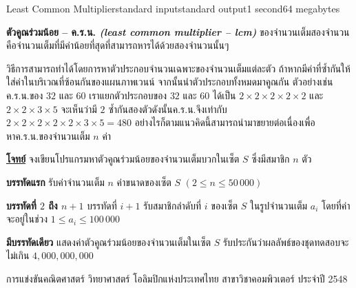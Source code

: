 \documentclass[11pt,a4paper]{article}
\begin{document}
\begin{problem}{Least Common Multiplier}{standard input}{standard output}{1 second}{64 megabytes}

\textbf{ตัวคูณร่วมน้อย – ค.ร.น. \textit{(least common multiplier – lcm)}} ของจำนวนเต็มสองจำนวนคือจำนวนเต็มที่มีค่าน้อยที่สุดที่สามารถหารได้ด้วยสองจำนวนนั้นๆ

วิธีการสามารถทำได้โดยการหาตัวประกอบจำนวนเฉพาะของจำนวนเต็มแต่ละตัว ถ้าหากมีค่าที่ซ้ำกันให้ใส่ค่าในบริเวณที่ซ้อนกันของแผนภาพเวนน์ จากนั้นนำตัวประกอบทั้งหมดมาคูณกัน ตัวอย่างเช่นค.ร.น.ของ $32$ และ $60$ เราแยกตัวประกอบของ $32$ และ $60$ ได้เป็น $2\times 2\times 2\times 2\times 2$ และ $2\times 2\times 3\times 5$ จะเห็นว่ามี $2$ ซ้ำกันสองตัวดังนั้นค.ร.น.จึงเท่ากับ $2\times 2\times 2\times 2\times 2\times 3\times 5 = 480$ อย่างไรก็ตามแนวคิดนี้สามารถนำมาขยายต่อเนื่องเพื่อหาค.ร.น.ของจำนวนเต็ม $n$ ค่า

\bigskip
\underline{\textbf{โจทย์}}  จงเขียนโปรแกรมหาตัวคูณร่วมน้อยของจำนวนเต็มบวกในเซ็ต $S$ ซึ่งมีสมาชิก $n$ ตัว

\InputFile

\textbf{บรรทัดแรก} รับค่าจำนวนเต็ม $n$ ค่าขนาดของเซ็ต $S$  $(2 \leq n \leq 50\,000)$

\textbf{บรรทัดที่ $2$ ถึง $n+1$} บรรทัดที่ $i+1$ รับสมาชิกลำดับที่ $i$ ของเซ็ต $S$ ในรูปจำนวนเต็ม $a_i$ โดยที่ค่าจะอยู่ในช่วง $1 \leq a_i \leq 100\,000$

\OutputFile

\textbf{มีบรรทัดเดียว} แสดงค่าตัวคูณร่วมน้อยของจำนวนเต็มในเซ็ต $S$ รับประกันว่าผลลัพธ์ของชุดทดสอบจะไม่เกิน $4,000,000,000$

\Examples

\begin{example}
%
\end{example}


\Source

การแข่งขันคณิตศาสตร์ วิทยาศาสตร์ โอลิมปิกแห่งประเทศไทย สาขาวิชาคอมพิวเตอร์ ประจำปี 2548


\end{problem}
\end{document}
